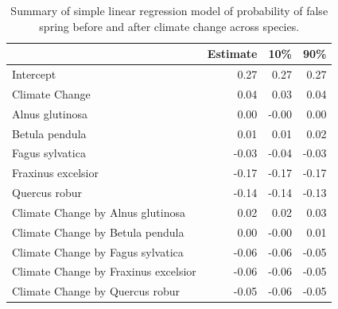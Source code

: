 \documentclass{article}\usepackage[]{graphicx}\usepackage[]{color}
\begin{document}
\begin{table}[H]
\centering
\caption{Summary of simple linear regression model of probability of false spring before and after climate change across species.} 
\begin{tabular}{lrrr}
  \hline
 & Estimate & 10\% & 90\% \\ 
  \hline
Intercept & 0.27 & 0.27 & 0.27 \\ 
  Climate Change & 0.04 & 0.03 & 0.04 \\ 
  Alnus glutinosa & 0.00 & -0.00 & 0.00 \\ 
  Betula pendula & 0.01 & 0.01 & 0.02 \\ 
  Fagus sylvatica & -0.03 & -0.04 & -0.03 \\ 
  Fraxinus excelsior & -0.17 & -0.17 & -0.17 \\ 
  Quercus robur & -0.14 & -0.14 & -0.13 \\ 
  Climate Change by Alnus glutinosa & 0.02 & 0.02 & 0.03 \\ 
  Climate Change by Betula pendula & 0.00 & -0.00 & 0.01 \\ 
  Climate Change by Fagus sylvatica & -0.06 & -0.06 & -0.05 \\ 
  Climate Change by Fraxinus excelsior & -0.06 & -0.06 & -0.05 \\ 
  Climate Change by Quercus robur & -0.05 & -0.06 & -0.05 \\ 
   \hline
\end{tabular}
\end{table}
\end{document}
